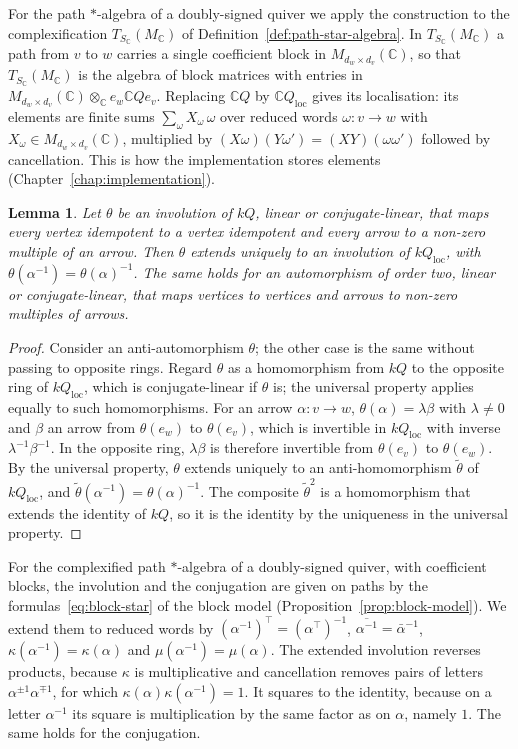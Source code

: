 \documentclass[12pt, a4paper]{report}
\theoremstyle{plain}
\newtheorem{lemma}[theorem]{Lemma}
\theoremstyle{definition}
\theoremstyle{remark}
\theoremstyle{plain}
\newcommand{\CC}{\mathbb{C}}
\begin{document}
For the path $*$-algebra of a doubly-signed quiver we apply the construction to the complexification $T_{S_\CC}(M_\CC)$ of Definition~\ref{def:path-star-algebra}. In $T_{S_\CC}(M_\CC)$ a path from $v$ to $w$ carries a single coefficient block in $M_{d_w\times d_v}(\CC)$, so that $T_{S_\CC}(M_\CC)$ is the algebra of block matrices with entries in $M_{d_w\times d_v}(\CC)\otimes_\CC e_w\CC Qe_v$. Replacing $\CC Q$ by $\CC Q_{\mathrm{loc}}$ gives its localisation: its elements are finite sums $\sum_\omega X_\omega\,\omega$ over reduced words $\omega:v\to w$ with $X_\omega\in M_{d_w\times d_v}(\CC)$, multiplied by $(X\omega)(Y\omega')=(XY)(\omega\omega')$ followed by cancellation. This is how the implementation stores elements (Chapter~\ref{chap:implementation}).

\begin{lemma}\label{lem:loc-involution}
Let $\theta$ be an involution of $kQ$, linear or conjugate-linear, that maps every vertex idempotent to a vertex idempotent and every arrow to a non-zero multiple of an arrow. Then $\theta$ extends uniquely to an involution of $kQ_{\mathrm{loc}}$, with $\theta(\alpha^{-1})=\theta(\alpha)^{-1}$. The same holds for an automorphism of order two, linear or conjugate-linear, that maps vertices to vertices and arrows to non-zero multiples of arrows.
\end{lemma}
\begin{proof}
Consider an anti-automorphism $\theta$; the other case is the same without passing to opposite rings. Regard $\theta$ as a homomorphism from $kQ$ to the opposite ring of $kQ_{\mathrm{loc}}$, which is conjugate-linear if $\theta$ is; the universal property applies equally to such homomorphisms. For an arrow $\alpha:v\to w$, $\theta(\alpha)=\lambda\beta$ with $\lambda\neq0$ and $\beta$ an arrow from $\theta(e_w)$ to $\theta(e_v)$, which is invertible in $kQ_{\mathrm{loc}}$ with inverse $\lambda^{-1}\beta^{-1}$. In the opposite ring, $\lambda\beta$ is therefore invertible from $\theta(e_v)$ to $\theta(e_w)$. By the universal property, $\theta$ extends uniquely to an anti-homomorphism $\tilde\theta$ of $kQ_{\mathrm{loc}}$, and $\tilde\theta(\alpha^{-1})=\theta(\alpha)^{-1}$. The composite $\tilde\theta^2$ is a homomorphism that extends the identity of $kQ$, so it is the identity by the uniqueness in the universal property.
\end{proof}

For the complexified path $*$-algebra of a doubly-signed quiver, with coefficient blocks, the involution and the conjugation are given on paths by the formulas~\eqref{eq:block-star} of the block model (Proposition~\ref{prop:block-model}). We extend them to reduced words by $(\alpha^{-1})^{\top}=(\alpha^{\top})^{-1}$, $\overline{\alpha^{-1}}=\bar\alpha^{-1}$, $\kappa(\alpha^{-1})=\kappa(\alpha)$ and $\mu(\alpha^{-1})=\mu(\alpha)$. The extended involution reverses products, because $\kappa$ is multiplicative and cancellation removes pairs of letters $\alpha^{\pm1}\alpha^{\mp1}$, for which $\kappa(\alpha)\kappa(\alpha^{-1})=1$. It squares to the identity, because on a letter $\alpha^{-1}$ its square is multiplication by the same factor as on $\alpha$, namely $1$. The same holds for the conjugation.
\end{document}
